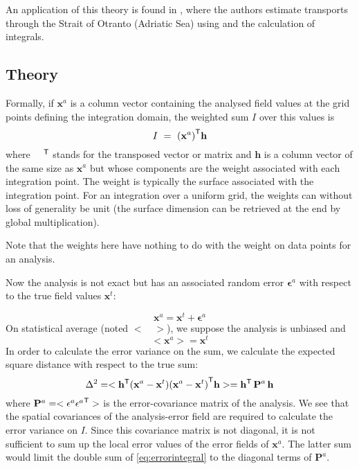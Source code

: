 An application of this theory is found in \citet{YARI12}, where the authors estimate transports through the Strait of Otranto (Adriatic Sea) using \diva and the calculation of integrals.

\subsection{Theory}

Formally, if $\mathbf{x}^a$ is a column vector containing the analysed field values at the grid
points defining the integration domain, the weighted sum $I$ over this values is
\begin{equation}
I~=~{(\mathbf{x}^a)}^\mathsf{T} \mathbf{h}
\end{equation}
where ${\quad}^\mathsf{T}$ stands for the transposed vector or matrix and $\mathbf{h}$ is a column vector of the same size as
$\mathbf{x}^a$ but whose components are the weight associated with each integration point. The weight is typically the surface associated with
the integration point. For an integration over a uniform grid, the weights can without loss of generality be unit (the surface dimension can be retrieved at the end by global multiplication). 

Note that the weights here have nothing to do with the weight on data points for an analysis.

Now the analysis is not exact but has an associated random error $\mathbf{\epsilon}^a$ with respect to the true
field values $\mathbf{x}^t$:

\begin{equation}
{\mathbf{x}^a} = \mathbf{x}^t + \mathbf{\epsilon}^a
\end{equation}
On statistical average (noted $< \quad >$), we suppose the analysis is unbiased and
\begin{equation}
<{\mathbf{x}^a}> = \mathbf{x}^t 
\end{equation}
In order to calculate the error variance on the sum, we calculate the expected square distance with respect to the true sum:
\begin{equation}
\Delta^2 = < {\mathbf{h}}^\mathsf{T}( {\mathbf{x}^a} - \mathbf{x}^t) {({\mathbf{x}^a} - \mathbf{x}^t )}^\mathsf{T} \mathbf{h} > = {\mathbf{h}}^\mathsf{T} \, \mathbf{P}^a \, \mathbf{h}
\label{eq:errorintegral}
\end{equation}
where $\mathbf{P}^a = <\mathbf{\epsilon}^a {\mathbf{\epsilon}^a}^\mathsf{T} >$ is the error-covariance matrix of the analysis.
We see that the spatial covariances of the analysis-error field are required to calculate the error variance on $I$. Since this
covariance matrix is not diagonal, it is not sufficient to sum up the local error values of the error fields of $\mathbf{x}^a$. The latter sum would limit
the double sum of \eqref{eq:errorintegral} to the diagonal terms of $\mathbf{P}^a$.


